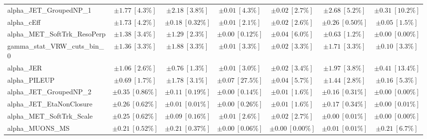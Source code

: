 \begin{sidewaystable}
\begin{center}
\begin{tabular*}{\textwidth}{@{\extracolsep{\fill}}lcccccc}
alpha\_JET\_GroupedNP\_1         & $\pm 1.77\ [4.3\%] $          & $\pm 2.18\ [3.8\%] $          & $\pm 0.01\ [4.3\%] $          & $\pm 0.02\ [2.7\%] $          & $\pm 2.68\ [5.2\%] $          & $\pm 0.31\ [10.2\%] $       \\
alpha\_cEff         & $\pm 1.73\ [4.2\%] $          & $\pm 0.18\ [0.32\%] $          & $\pm 0.01\ [2.1\%] $          & $\pm 0.02\ [2.6\%] $          & $\pm 0.26\ [0.50\%] $          & $\pm 0.05\ [1.5\%] $       \\
alpha\_MET\_SoftTrk\_ResoPerp         & $\pm 1.38\ [3.4\%] $          & $\pm 1.29\ [2.3\%] $          & $\pm 0.00\ [0.12\%] $          & $\pm 0.04\ [6.0\%] $          & $\pm 0.63\ [1.2\%] $          & $\pm 0.00\ [0.00\%] $       \\
gamma\_stat\_VRW\_cuts\_bin\_0         & $\pm 1.36\ [3.3\%] $          & $\pm 1.88\ [3.3\%] $          & $\pm 0.01\ [3.3\%] $          & $\pm 0.02\ [3.3\%] $          & $\pm 1.71\ [3.3\%] $          & $\pm 0.10\ [3.3\%] $       \\
alpha\_JER         & $\pm 1.06\ [2.6\%] $          & $\pm 0.76\ [1.3\%] $          & $\pm 0.01\ [3.0\%] $          & $\pm 0.02\ [3.4\%] $          & $\pm 1.97\ [3.8\%] $          & $\pm 0.41\ [13.4\%] $       \\
alpha\_PILEUP         & $\pm 0.69\ [1.7\%] $          & $\pm 1.78\ [3.1\%] $          & $\pm 0.07\ [27.5\%] $          & $\pm 0.04\ [5.7\%] $          & $\pm 1.44\ [2.8\%] $          & $\pm 0.16\ [5.3\%] $       \\
alpha\_JET\_GroupedNP\_2         & $\pm 0.35\ [0.86\%] $          & $\pm 0.11\ [0.19\%] $          & $\pm 0.00\ [0.14\%] $          & $\pm 0.01\ [1.6\%] $          & $\pm 0.16\ [0.31\%] $          & $\pm 0.00\ [0.00\%] $       \\
alpha\_JET\_EtaNonClosure         & $\pm 0.26\ [0.62\%] $          & $\pm 0.01\ [0.01\%] $          & $\pm 0.00\ [0.26\%] $          & $\pm 0.01\ [1.6\%] $          & $\pm 0.17\ [0.34\%] $          & $\pm 0.00\ [0.01\%] $       \\
alpha\_MET\_SoftTrk\_Scale         & $\pm 0.25\ [0.62\%] $          & $\pm 0.09\ [0.16\%] $          & $\pm 0.01\ [2.6\%] $          & $\pm 0.02\ [2.7\%] $          & $\pm 0.00\ [0.01\%] $          & $\pm 0.00\ [0.00\%] $       \\
alpha\_MUONS\_MS         & $\pm 0.21\ [0.52\%] $          & $\pm 0.21\ [0.37\%] $          & $\pm 0.00\ [0.06\%] $          & $\pm 0.00\ [0.00\%] $          & $\pm 0.01\ [0.01\%] $          & $\pm 0.21\ [6.7\%] $       \\

\end{tabular*}
\end{center}
\end{sidewaystable}
